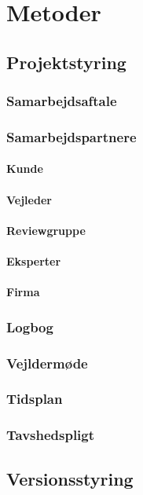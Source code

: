 \chapter{Metoder}

\section{Projektstyring}
\subsection{Samarbejdsaftale}
\subsection{Samarbejdspartnere}
\subsubsection{Kunde}
\subsubsection{Vejleder}
\subsubsection{Reviewgruppe}
\subsubsection{Eksperter}
\subsubsection{Firma}

\subsection{Logbog}
\subsection{Vejldermøde}
\subsection{Tidsplan}
\subsection{Tavshedspligt}

\section{Versionsstyring}

